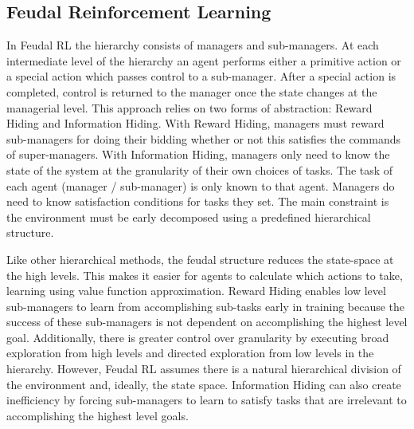 \subsection{Feudal Reinforcement Learning}

In Feudal RL \cite{Dayan} the hierarchy consists
of managers and sub-managers. At each intermediate level of the hierarchy an agent performs
either a primitive action or
a special action which passes control to a sub-manager. After a special action
is completed, control is
returned to the manager once the state changes at the managerial level. This
approach relies on two
forms of abstraction: Reward Hiding and Information Hiding. 
With Reward Hiding, managers must reward sub-managers for doing their bidding whether or not this
satisfies the commands of super-managers. With Information Hiding, managers only need to know the state of the system at the granularity of their own choices of tasks. The task of each agent (manager / sub-manager) is only known to that agent. Managers do need to know satisfaction conditions for tasks they set. The main constraint is the environment must be early
decomposed using a predefined hierarchical structure.

Like other hierarchical methods, the feudal structure reduces the state-space at the high levels.
This makes it easier for agents to calculate which actions to take, learning using value function approximation.
Reward Hiding enables low level sub-managers to learn from accomplishing sub-tasks early in training
because the success of these sub-managers is not dependent on accomplishing the highest level goal.
Additionally, there is  greater control over granularity by executing broad exploration from high levels
and directed exploration from low levels in the hierarchy. However, Feudal RL assumes there is a natural hierarchical division of the environment and, ideally, the state space. Information Hiding can also create inefficiency by forcing sub-managers to learn to satisfy tasks that are irrelevant to accomplishing the highest level goals.


